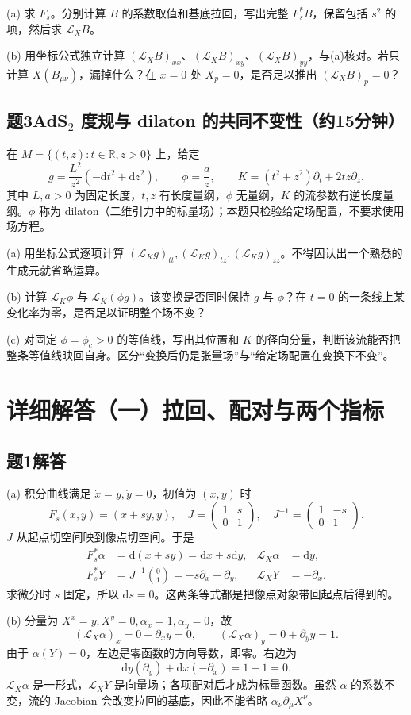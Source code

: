 \documentclass[11pt,a4paper]{article}
\newcommand{\D}{\mathrm d}\newcommand{\Lie}{\mathcal L}
\newcommand{\head}[1]{\section*{\color{teal}#1}}
\begin{document}
(a) 求 $F_s$。分别计算 $B$ 的系数取值和基底拉回，写出完整 $F_s^*B$，保留包括 $s^2$ 的项，然后求 $\Lie_XB$。

(b) 用坐标公式独立计算 $(\Lie_XB)_{xx}$、$(\Lie_XB)_{xy}$、$(\Lie_XB)_{yy}$，与(a)核对。若只计算 $X(B_{\mu\nu})$，漏掉什么？在 $x=0$ 处 $X_p=0$，是否足以推出 $(\Lie_XB)_p=0$？
\subsection*{题3\quad AdS$_2$ 度规与 dilaton 的共同不变性（约15分钟）}
在 $M=\{(t,z):t\in\mathbb R,z>0\}$ 上，给定
\[
 g=\frac{L^2}{z^2}(-\D t^2+\D z^2),\qquad
 \phi=\frac{a}{z},\qquad K=(t^2+z^2)\partial_t+2tz\partial_z.
\]
其中 $L,a>0$ 为固定长度，$t,z$ 有长度量纲，$\phi$ 无量纲，$K$ 的流参数有逆长度量纲。$\phi$ 称为 dilaton（二维引力中的标量场）；本题只检验给定场配置，不要求使用场方程。

(a) 用坐标公式逐项计算 $(\Lie_Kg)_{tt},(\Lie_Kg)_{tz},(\Lie_Kg)_{zz}$。不得因认出一个熟悉的生成元就省略运算。

(b) 计算 $\Lie_K\phi$ 与 $\Lie_K(\phi g)$。该变换是否同时保持 $g$ 与 $\phi$？在 $t=0$ 的一条线上某变化率为零，是否足以证明整个场不变？

(c) 对固定 $\phi=\phi_c>0$ 的等值线，写出其位置和 $K$ 的径向分量，判断该流能否把整条等值线映回自身。区分“变换后仍是张量场”与“给定场配置在变换下不变”。
\newpage
\head{详细解答（一）\quad 拉回、配对与两个指标}
\subsection*{题1解答}
(a) 积分曲线满足 $\dot x=y,\dot y=0$，初值为 $(x,y)$ 时
\[
 F_s(x,y)=(x+sy,y),\quad
 J=\begin{pmatrix}1&s\\0&1\end{pmatrix},\quad
 J^{-1}=\begin{pmatrix}1&-s\\0&1\end{pmatrix}.
\]
$J$ 从起点切空间映到像点切空间。于是
\begin{align*}
 F_s^*\alpha&=\D(x+sy)=\D x+s\D y,&\Lie_X\alpha&=\D y,\\
 F_s^*Y&=J^{-1}\binom{0}{1}=-s\partial_x+\partial_y,
 &\Lie_XY&=-\partial_x.
\end{align*}
求微分时 $s$ 固定，所以 $\D s=0$。这两条等式都是把像点对象带回起点后得到的。

(b) 分量为 $X^x=y,X^y=0,\alpha_x=1,\alpha_y=0$，故
\[
 (\Lie_X\alpha)_x=0+\partial_xy=0,\qquad
 (\Lie_X\alpha)_y=0+\partial_yy=1.
\]
由于 $\alpha(Y)=0$，左边是零函数的方向导数，即零。右边为
\[
 \D y(\partial_y)+\D x(-\partial_x)=1-1=0.
\]
$\Lie_X\alpha$ 是一形式，$\Lie_XY$ 是向量场；各项配对后才成为标量函数。虽然 $\alpha$ 的系数不变，流的 Jacobian 会改变拉回的基底，因此不能省略 $\alpha_\nu\partial_\mu X^\nu$。
\end{document}

